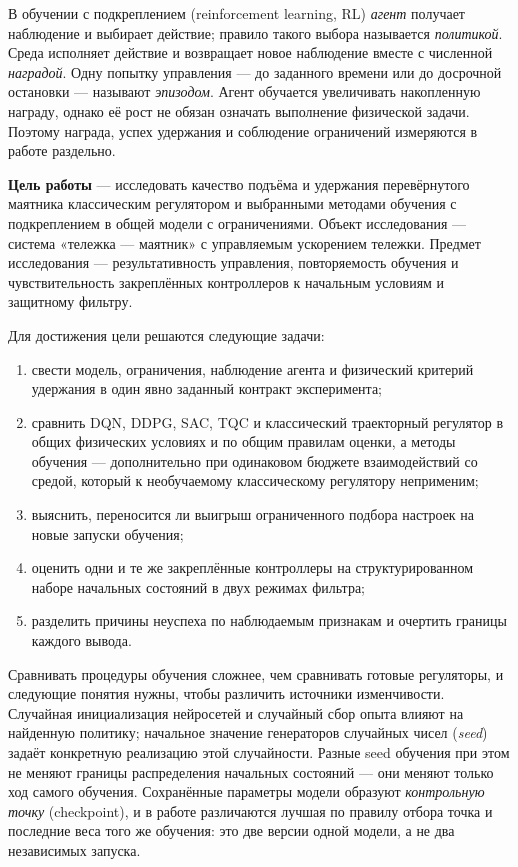 В обучении с подкреплением (reinforcement learning, RL) \emph{агент} получает наблюдение и выбирает действие; правило такого выбора называется \emph{политикой}. Среда исполняет действие и возвращает новое наблюдение вместе с численной \emph{наградой}. Одну попытку управления — до заданного времени или до досрочной остановки — называют \emph{эпизодом}. Агент обучается увеличивать накопленную награду, однако её рост не обязан означать выполнение физической задачи. Поэтому награда, успех удержания и соблюдение ограничений измеряются в работе раздельно.

\textbf{Цель работы} — исследовать качество подъёма и удержания перевёрнутого маятника классическим регулятором и выбранными методами обучения с подкреплением в общей модели с ограничениями. Объект исследования — система «тележка — маятник» с управляемым ускорением тележки. Предмет исследования — результативность управления, повторяемость обучения и чувствительность закреплённых контроллеров к начальным условиям и защитному фильтру.

Для достижения цели решаются следующие задачи:
\begin{enumerate}
\item свести модель, ограничения, наблюдение агента и физический критерий удержания в один явно заданный контракт эксперимента;
\item сравнить DQN, DDPG, SAC, TQC и классический траекторный регулятор в общих физических условиях и по общим правилам оценки, а методы обучения — дополнительно при одинаковом бюджете взаимодействий со средой, который к необучаемому классическому регулятору неприменим;
\item выяснить, переносится ли выигрыш ограниченного подбора настроек на новые запуски обучения;
\item оценить одни и те же закреплённые контроллеры на структурированном наборе начальных состояний в двух режимах фильтра;
\item разделить причины неуспеха по наблюдаемым признакам и очертить границы каждого вывода.
\end{enumerate}

Сравнивать процедуры обучения сложнее, чем сравнивать готовые регуляторы, и следующие понятия нужны, чтобы различить источники изменчивости. Случайная инициализация нейросетей и случайный сбор опыта влияют на найденную политику; начальное значение генераторов случайных чисел (\emph{seed}) задаёт конкретную реализацию этой случайности. Разные seed обучения при этом не меняют границы распределения начальных состояний — они меняют только ход самого обучения. Сохранённые параметры модели образуют \emph{контрольную точку} (checkpoint), и в работе различаются лучшая по правилу отбора точка и последние веса того же обучения: это две версии одной модели, а не два независимых запуска.

